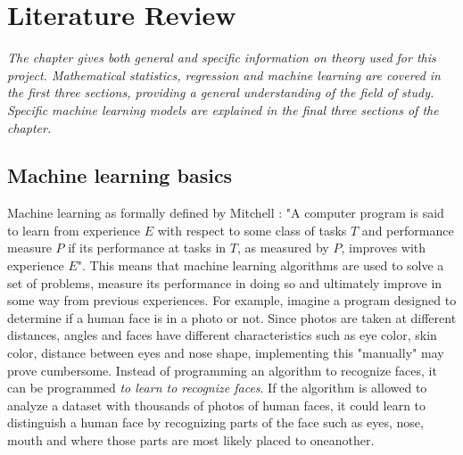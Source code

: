\chapter{Literature Review} \label {ch:theory}
\emph{The chapter gives both general and specific information on theory used for this project.  Mathematical statistics, regression and machine learning are covered in the first three sections, providing a general understanding of the field of study. Specific machine learning models are explained in the final three sections of the chapter. }


\section{Machine learning basics} \label{sec:mlbasics}


	
	Machine learning as formally defined by Mitchell \cite{BOOK:2}: 
"A computer program is said to learn from experience $E$ with respect to some class of tasks $T$ and performance measure $P$ if its performance at tasks in $T$, as measured by $P$, improves with experience $E$".	This means that machine learning algorithms are used to solve a set of problems, measure its performance in doing so and ultimately improve in some way from previous experiences. For example, imagine a program designed to determine if a human face is in a photo or not. Since photos are taken at different distances, angles and faces have different characteristics such as eye color, skin color, distance between eyes and nose shape, implementing this "manually" may prove cumbersome. Instead of programming an algorithm to recognize faces, it can be programmed  \emph{to learn to recognize faces}. If the algorithm is allowed to analyze a dataset with thousands of photos of human faces, it could learn to distinguish a human face by recognizing parts of the face such as eyes, nose, mouth and where those parts are most likely placed to oneanother.


